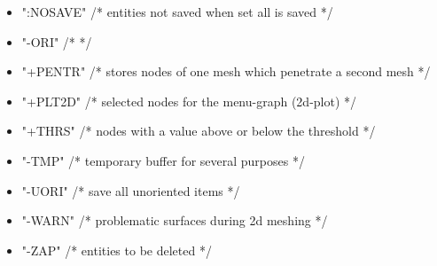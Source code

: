 \documentclass{article}
\begin{document}
\begin{itemize}
\item      ":NOSAVE" /* entities not saved when set all is saved */ 
\item      "-ORI"    /*  */
\item      "+PENTR"  /* stores nodes of one mesh which penetrate a second mesh */
\item      "+PLT2D"  /* selected nodes for the menu-graph (2d-plot) */
\item      "+THRS"   /* nodes with a value above or below the threshold */
\item      "-TMP"    /* temporary buffer for several purposes */
\item      "-UORI"   /* save all unoriented items */
\item      "-WARN"   /* problematic surfaces during 2d meshing */
\item      "-ZAP"    /* entities to be deleted */
\end{itemize}
 
\end{document}

